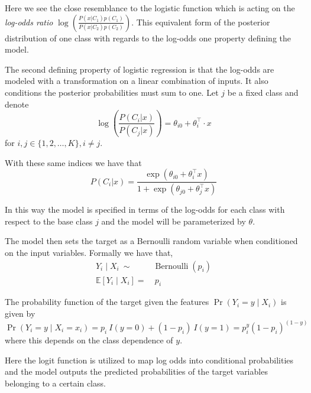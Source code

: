 Here we see the close resemblance to the logistic function which is acting on the \textit{log-odds ratio} $ \log \left(  \frac{ P(x|C_1)p(C_1)}{P(x|C_2)p(C_2) } \right)$. This equivalent form of the posterior distribution of one class with regards to the log-odds one property defining the model.



The second defining property of logistic regression is that the log-odds are modeled with a transformation on a linear combination of inputs. It also conditions the posterior probabilities must sum to one. Let $j$ be a fixed class and denote
\begin{equation}\label{logit-logOddss}
 \log \left( \frac{P(C_i|x)}{P(C_j|x)} \right) = \theta_{i0} + \theta_i^\intercal \cdot x
 \end{equation}
for $i,j \in \{1,2,\ldots,K\}, i\neq j$.

With these same indices we have that
\begin{equation} P(C_i|x) = \frac{\exp(\theta_{i0} + \theta_i^\intercal x)}{1 + \exp(\theta_{j0} + \theta_j^\intercal x)}
\end{equation}

In this way the model is specified in terms of the log-odds for each class with respect to the base class $j$ and the model will be parameterized by $\theta$.

The model then sets the target as a Bernoulli random variable when conditioned on the input variables. Formally we have that,
\begin{equation}
\begin{split}
Y_i \mid X_i \ \sim & \operatorname{Bernoulli}(p_i) \\
\mathbb{E}[Y_i \mid X_i ] = & \ p_i
\end{split}
\end{equation}


The probability function of the target given the features $\Pr(Y_i=y\mid X_i)$ is given by
\begin{equation}\label{logit-probabilityDensity}
\Pr(Y_i=y \mid X_i = x_i) = p_i \ I(y=0) + (1-p_i) \ I(y=1) = p_i^{y} {(1-p_i)}^{(1-y)}
\end{equation}
where this depends on the class dependence of $y$.

Here the logit function is utilized to map log odds into conditional probabilities and the model outputs the predicted probabilities of the target variables belonging to a certain class.


